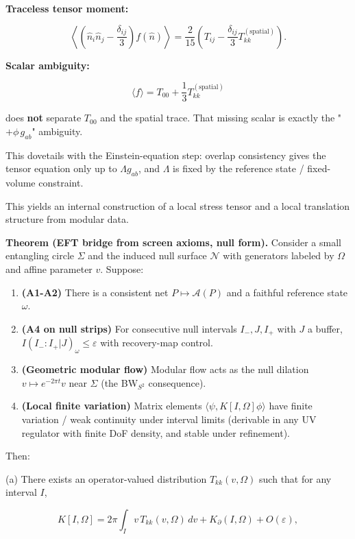 \textbf{Traceless tensor moment:}

\[
\left\langle \left(\hat{n}_i \hat{n}_j - \frac{\delta_{ij}}{3}\right) f(\hat{n}) \right\rangle
= \frac{2}{15} \left(T_{ij} - \frac{\delta_{ij}}{3} T_{kk}^{\mathrm{(spatial)}}\right).
\]

\textbf{Scalar ambiguity:}

\[
\langle f \rangle = T_{00} + \frac{1}{3} T_{kk}^{\mathrm{(spatial)}}
\]

does \textbf{not} separate \(T_{00}\) and the spatial trace. That missing scalar is exactly the "\(+ \phi \, g_{ab}\)" ambiguity.

This dovetails with the Einstein-equation step: overlap consistency gives the tensor equation only up to \(\Lambda g_{ab}\), and \(\Lambda\) is fixed by the reference state / fixed-volume constraint.

This yields an internal construction of a local stress tensor and a local translation structure from modular data.

\textbf{Theorem (EFT bridge from screen axioms, null form).} Consider a small entangling circle \(\Sigma\) and the induced null surface \(\mathcal{N}\) with generators labeled by \(\Omega\) and affine parameter \(v\). Suppose:

\begin{enumerate}
\def\labelenumi{\arabic{enumi}.}
\tightlist
\item
  \textbf{(A1-A2)} There is a consistent net \(P \mapsto \mathcal{A}(P)\) and a faithful reference state \(\omega\).
\item
  \textbf{(A4 on null strips)} For consecutive null intervals \(I_-, J, I_+\) with \(J\) a buffer, \(I(I_-:I_+|J)_\omega \le \varepsilon\) with recovery-map control.
\item
  \textbf{(Geometric modular flow)} Modular flow acts as the null dilation \(v \mapsto e^{-2\pi t} v\) near \(\Sigma\) (the BW\(_{S^2}\) consequence).
\item
  \textbf{(Local finite variation)} Matrix elements \(\langle \psi, K[I,\Omega] \phi \rangle\) have finite variation / weak continuity under interval limits (derivable in any UV regulator with finite DoF density, and stable under refinement).
\end{enumerate}

Then:

(a) There exists an operator-valued distribution \(T_{kk}(v,\Omega)\) such that for any interval \(I\),

\[
K[I,\Omega] = 2\pi \int_I v \, T_{kk}(v,\Omega) \, dv + K_\partial(I,\Omega) + O(\varepsilon),
\]


